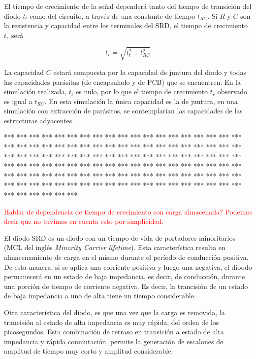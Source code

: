 El tiempo de crecimiento de la señal dependerá tanto del tiempo de transición
del diodo $t_t$ como del circuito, a través de una constante de tiempo $t_{RC}$.
Si $R$ y $C$ son la resistencia y capacidad entre los terminales del SRD, el
tiempo de crecimiento $t_r$ será \cite{an918}

\begin{equation}
    t_r = \sqrt{t_t^2+t_{RC}^2}
\end{equation}

La capacidad $C$ estará compuesta por la capacidad de juntura del diodo y todas
las capacidades parásitas (de encapsulado y de PCB) que se encuentren. En la
simulación realizada, $t_t$ es nulo, por lo que el tiempo de crecimiento $t_r$
observado es igual a $t_{RC}$. En esta simulación la única capacidad es la de
juntura, en una simulación con extracción de parásitos, se contemplarían las
capacidades de las estructuras adyacentes.

*** *** *** *** *** *** *** *** *** *** *** *** *** *** *** *** *** *** *** ***
*** *** *** *** *** *** *** *** *** *** *** *** *** *** *** *** *** *** *** ***
*** *** *** *** *** *** *** *** *** *** *** *** *** *** *** *** *** *** *** ***
*** *** *** *** *** *** *** *** *** *** *** *** *** *** *** *** *** *** *** ***
*** *** *** *** *** *** *** *** *** *** *** *** *** *** *** *** *** *** *** ***
*** *** *** *** *** *** *** *** *** *** *** *** *** *** *** *** *** *** *** ***

\textcolor{red}{Hablar de dependencia de tiempo de crecimiento con carga
almacenada? Podemos decir que no tuvimos en cuenta esto por simplicidad.}

El diodo SRD es un diodo con un tiempo de vida de portadores minoritarios (MCL
del inglés \textit{Minority Carrier lifetime}). Esta característica resulta en
almacenamiento de carga en el mismo durante el período de conducción positiva.
De esta manera, si se aplica una corriente positiva y luego una negativa, el
dioodo permanecerá en un estado de baja impedancia, es decir, de conducción,
durante una porción de tiempo de corriente negativa. Es decir, la trancisión de
un estado de baja impedancia a uno de alta tiene un tiempo considerable.

Otra característica del diodo, es que una vez que la carga es removida, la
trancisión al estado de alta impedancia es muy rápida, del orden de los
picosegundos. Esta combinación de retraso en transición a estado de alta
impedancia y rápida conmutación, permite la generación de escalones de amplitud
de tiempo muy corto y amplitud considerable.


